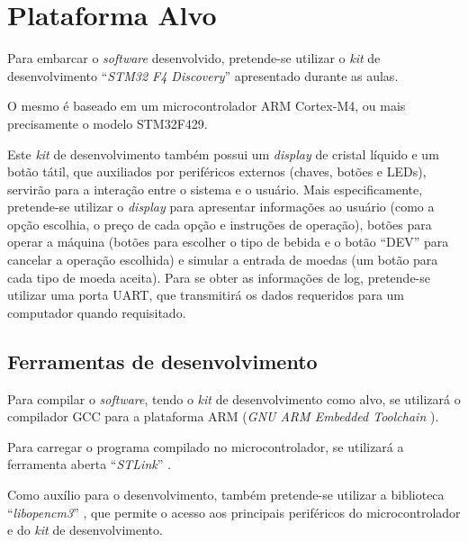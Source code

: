 %
%
%
%
%

%
%
%
%
%

\section{Plataforma Alvo} \label{sec:platform}

Para embarcar o \textit{software} desenvolvido, pretende-se utilizar o \textit{kit} de desenvolvimento ``\textit{STM32 F4 Discovery}'' \cite{stm32_discovery} apresentado durante as aulas.

O mesmo é baseado em um microcontrolador ARM Cortex-M4, ou mais precisamente o modelo STM32F429.

Este \textit{kit} de desenvolvimento também possui um \textit{display} de cristal líquido e um botão tátil, que auxiliados por periféricos externos (chaves, botões e LEDs), servirão para a interação entre o sistema e o usuário. Mais especificamente, pretende-se utilizar o \textit{display} para apresentar informações ao usuário (como a opção escolhia, o preço de cada opção e instruções de operação), botões para operar a máquina (botões para escolher o tipo de bebida e o botão ``DEV'' para cancelar a operação escolhida) e simular a entrada de moedas (um botão para cada tipo de moeda aceita). Para se obter as informações de log, pretende-se utilizar uma porta UART, que transmitirá os dados requeridos para um computador quando requisitado.

\subsection{Ferramentas de desenvolvimento}

Para compilar o \textit{software}, tendo o \textit{kit} de desenvolvimento como alvo, se utilizará o compilador GCC para a plataforma ARM (\textit{GNU ARM Embedded Toolchain} \cite{gcc_arm}).

Para carregar o programa compilado no microcontrolador, se utilizará a ferramenta aberta ``\textit{STLink}'' \cite{stlink}.

Como auxílio para o desenvolvimento, também pretende-se utilizar a biblioteca ``\textit{libopencm3}'' \cite{libopencm3}, que permite o acesso aos principais periféricos do microcontrolador e do \textit{kit} de desenvolvimento.
